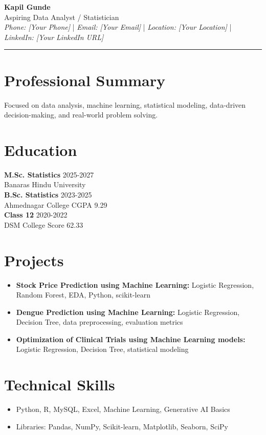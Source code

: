 \documentclass[a4paper,10pt]{article}
\begin{document}
\begin{center}
    \textbf{Kapil Gunde} \\
    Aspiring Data Analyst / Statistician \\
    \textit{Phone: [Your Phone]} | \textit{Email: [Your Email]} | \textit{Location: [Your Location]} | \textit{LinkedIn: [Your LinkedIn URL]} \\
\end{center}
\hrule
\section*{Professional Summary}
Focused on data analysis, machine learning, statistical modeling, data-driven decision-making, and real-world problem solving.
\section*{Education}
\textbf{M.Sc. Statistics} \hfill 2025-2027 \\ 
Banaras Hindu University \\ 
\textbf{B.Sc. Statistics} \hfill 2023-2025 \\ 
Ahmednagar College \hfill CGPA 9.29 \\ 
\textbf{Class 12} \hfill 2020-2022 \\ 
DSM College \hfill Score 62.33
\section*{Projects}
\begin{itemize}[left=0pt]
    \item \textbf{Stock Price Prediction using Machine Learning:} Logistic Regression, Random Forest, EDA, Python, scikit-learn
    \item \textbf{Dengue Prediction using Machine Learning:} Logistic Regression, Decision Tree, data preprocessing, evaluation metrics
    \item \textbf{Optimization of Clinical Trials using Machine Learning models:} Logistic Regression, Decision Tree, statistical modeling
\end{itemize}
\section*{Technical Skills}
\begin{itemize}[left=0pt]
    \item Python, R, MySQL, Excel, Machine Learning, Generative AI Basics
    \item Libraries: Pandas, NumPy, Scikit-learn, Matplotlib, Seaborn, SciPy
\end{itemize}
\end{document}

